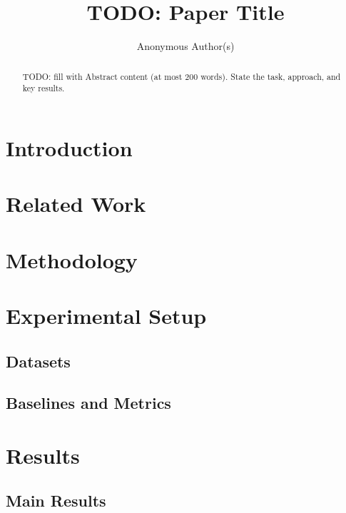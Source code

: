\documentclass{article}
\title{TODO: Paper Title}
\author{Anonymous Author(s)}
\begin{document}
\maketitle

\begin{abstract}
TODO: fill with Abstract content (at most 200 words). State the task, approach, and key results.
\end{abstract}

\section{Introduction}

\section{Related Work}

\section{Methodology}

\section{Experimental Setup}

\subsection{Datasets}

\subsection{Baselines and Metrics}

\section{Results}

\subsection{Main Results}
\end{document}
